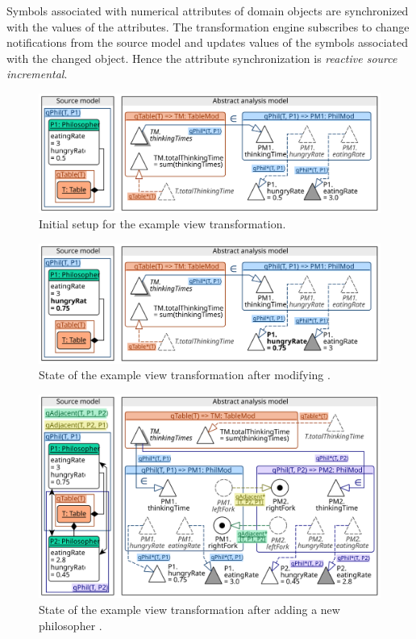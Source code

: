Symbols associated with numerical attributes of domain objects are synchronized with the values of the attributes. The transformation engine subscribes to change notifications from the source model and updates values of the symbols associated with the changed object. Hence the attribute synchronization is \emph{reactive source incremental}.

\begin{figure}
  \centering
  \includegraphics[scale=0.9]{figures/view_transformation_example_initial} 
  \caption{Initial setup for the example view transformation.}
  \label{fig:transform:view-1}
\end{figure}

\begin{figure}
  \centering
  \includegraphics[scale=0.9]{figures/view_transformation_example_2}
  \caption{State of the example view transformation after modifying .}
  \label{fig:transform:view-2}
\end{figure}

\begin{figure}
  \centering
  \includegraphics[scale=0.9]{figures/view_transformation_example}
  \caption{State of the example view transformation after adding a new philosopher .}
  \label{fig:transform:view-3}
\end{figure}

